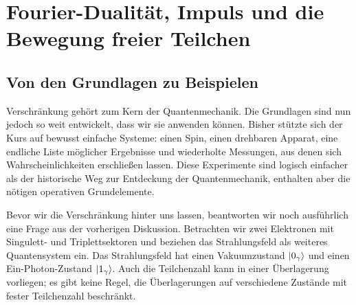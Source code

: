 \chapter{Fourier-Dualität, Impuls und die Bewegung freier Teilchen}

\section{Von den Grundlagen zu Beispielen}

Verschränkung gehört zum Kern der Quantenmechanik. Die Grundlagen sind nun jedoch so weit entwickelt, dass wir sie anwenden können. Bisher stützte sich der Kurs auf bewusst einfache Systeme: einen Spin, einen drehbaren Apparat, eine endliche Liste möglicher Ergebnisse und wiederholte Messungen, aus denen sich Wahrscheinlichkeiten erschließen lassen. Diese Experimente sind logisch einfacher als der historische Weg zur Entdeckung der Quantenmechanik, enthalten aber die nötigen operativen Grundelemente.

\begin{classroomqa}
\end{classroomqa}

\begin{classroomqa}
\end{classroomqa}

Bevor wir die Verschränkung hinter uns lassen, beantworten wir noch ausführlich eine Frage aus der vorherigen Diskussion. Betrachten wir zwei Elektronen mit Singulett- und Triplettsektoren und beziehen das Strahlungsfeld als weiteres Quantensystem ein. Das Strahlungsfeld hat einen Vakuumzustand \(\left\lvert0_\gamma\right\rangle\) und einen Ein-Photon-Zustand \(\left\lvert1_\gamma\right\rangle\). Auch die Teilchenzahl kann in einer Überlagerung vorliegen; es gibt keine Regel, die Überlagerungen auf verschiedene Zustände mit fester Teilchenzahl beschränkt.


